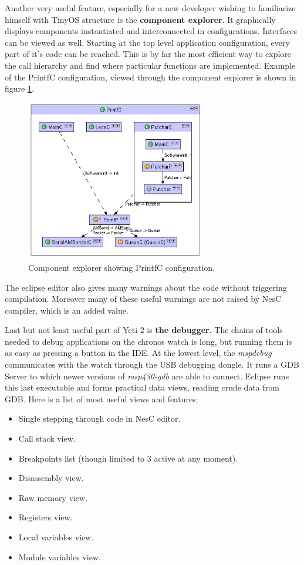 Another very useful feature, especially for a new developer wishing to
familiarize himself with TinyOS structure is the {\bf component
explorer}. It graphically displays components instantiated and
interconnected in configurations. Interfaces can be viewed as well.
Starting at the top level application configuration, every part of
it's code can be reached. This is by far the most efficient way to
explore the call hierarchy and find where particular functions are
implemented. Example of the PrintfC configuration, viewed through
the component explorer is shown in figure
\ref{fig:eclipse_compexp}.

\begin{figure}[h]
  \centering
  \includegraphics[width=0.7\textwidth]{img/eclipse_compexp.png}
  \caption{Component explorer showing PrintfC configuration.}
  \label{fig:eclipse_compexp}
\end{figure}

The eclipse editor also gives many warnings about the code without
triggering compilation. Moreover many of these useful warnings are not
raised by NesC compiler, which is an added value. 

Last but not least useful part of Yeti 2 is {\bf the debugger}. The
chains of tools needed to debug applications on the chronos watch is
long, but running them is as easy as pressing a button in the IDE. At
the lowest level, the \emph{mspdebug} communicates with the watch
through the USB debugging dongle. It runs a GDB Server to which newer
versions of \emph{msp430-gdb} are able to connect. Eclipse runs this
last executable and forms practical data views, reading crude data
from GDB. Here is a list of most useful views and features:
\begin{itemize}
  \item Single stepping through code in NesC editor.
  \item Call stack view.
  \item Breakpoints list (though limited to 3 active at any moment).
  \item Disassembly view.
  \item Raw memory view.
  \item Registers view.
  \item Local variables view.
  \item Module variables view.
\end{itemize}

